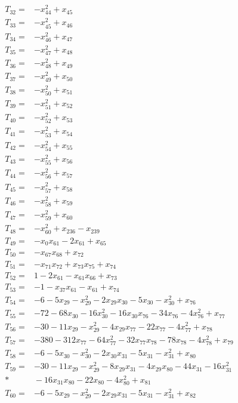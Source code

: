 \begin{align*}
T_{32}={}&-x_{44}^{2}+x_{45}\\[3pt]
T_{33}={}&-x_{45}^{2}+x_{46}\\[3pt]
T_{34}={}&-x_{46}^{2}+x_{47}\\[3pt]
T_{35}={}&-x_{47}^{2}+x_{48}\\[3pt]
T_{36}={}&-x_{48}^{2}+x_{49}\\[3pt]
T_{37}={}&-x_{49}^{2}+x_{50}\\[3pt]
T_{38}={}&-x_{50}^{2}+x_{51}\\[3pt]
T_{39}={}&-x_{51}^{2}+x_{52}\\[3pt]
T_{40}={}&-x_{52}^{2}+x_{53}\\[3pt]
T_{41}={}&-x_{53}^{2}+x_{54}\\[3pt]
T_{42}={}&-x_{54}^{2}+x_{55}\\[3pt]
T_{43}={}&-x_{55}^{2}+x_{56}\\[3pt]
T_{44}={}&-x_{56}^{2}+x_{57}\\[3pt]
T_{45}={}&-x_{57}^{2}+x_{58}\\[3pt]
T_{46}={}&-x_{58}^{2}+x_{59}\\[3pt]
T_{47}={}&-x_{59}^{2}+x_{60}\\[3pt]
T_{48}={}&-x_{60}^{2}+x_{236}-x_{239}\\[3pt]
T_{49}={}&-x_{0}x_{61}-2x_{61}+x_{65}\\[3pt]
T_{50}={}&-x_{67}x_{68}+x_{72}\\[3pt]
T_{51}={}&-x_{71}x_{72}+x_{73}x_{75}+x_{74}\\[3pt]
T_{52}={}&1-2x_{61}-x_{61}x_{66}+x_{73}\\[3pt]
T_{53}={}&-1-x_{37}x_{61}-x_{61}+x_{74}\\[3pt]
T_{54}={}&-6-5x_{29}-x_{29}^{2}-2x_{29}x_{30}-5x_{30}-x_{30}^{2}+x_{76}\\[3pt]
T_{55}={}&-72-68x_{30}-16x_{30}^{2}-16x_{30}x_{76}-34x_{76}-4x_{76}^{2}+x_{77}\\[3pt]
T_{56}={}&-30-11x_{29}-x_{29}^{2}-4x_{29}x_{77}-22x_{77}-4x_{77}^{2}+x_{78}\\[3pt]
T_{57}={}&-380-312x_{77}-64x_{77}^{2}-32x_{77}x_{78}-78x_{78}-4x_{78}^{2}+x_{79}\\[3pt]
T_{58}={}&-6-5x_{30}-x_{30}^{2}-2x_{30}x_{31}-5x_{31}-x_{31}^{2}+x_{80}\\[3pt]
T_{59}={}&-30-11x_{29}-x_{29}^{2}-8x_{29}x_{31}-4x_{29}x_{80}-44x_{31}-16x_{31}^{2}\\*
&{}-16x_{31}x_{80}-22x_{80}-4x_{80}^{2}+x_{81}\\[3pt]
T_{60}={}&-6-5x_{29}-x_{29}^{2}-2x_{29}x_{31}-5x_{31}-x_{31}^{2}+x_{82}\\[3pt]

\end{align*}
